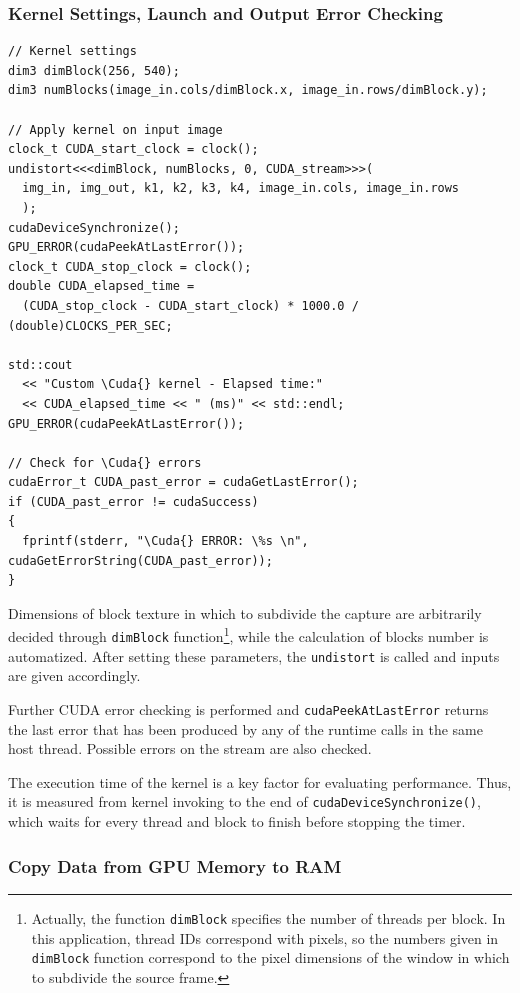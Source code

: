 \documentclass[12pt]{article}
\newcommand*{\Cuda}{\textsc{CUDA}}
\begin{document}
\subsubsection{Kernel Settings, Launch and Output Error Checking}
%
\begin{lstlisting}
// Kernel settings
dim3 dimBlock(256, 540);
dim3 numBlocks(image_in.cols/dimBlock.x, image_in.rows/dimBlock.y);

// Apply kernel on input image
clock_t CUDA_start_clock = clock();
undistort<<<dimBlock, numBlocks, 0, CUDA_stream>>>(
  img_in, img_out, k1, k2, k3, k4, image_in.cols, image_in.rows
  );
cudaDeviceSynchronize();
GPU_ERROR(cudaPeekAtLastError());
clock_t CUDA_stop_clock = clock();
double CUDA_elapsed_time =
  (CUDA_stop_clock - CUDA_start_clock) * 1000.0 / (double)CLOCKS_PER_SEC;

std::cout
  << "Custom \Cuda{} kernel - Elapsed time:"
  << CUDA_elapsed_time << " (ms)" << std::endl;
GPU_ERROR(cudaPeekAtLastError());

// Check for \Cuda{} errors
cudaError_t CUDA_past_error = cudaGetLastError();
if (CUDA_past_error != cudaSuccess)
{
  fprintf(stderr, "\Cuda{} ERROR: \%s \n", cudaGetErrorString(CUDA_past_error));
}
\end{lstlisting}
%
Dimensions of block texture in which to subdivide the capture are arbitrarily decided through \texttt{dimBlock} function\footnote{ Actually, the function \texttt{dimBlock} specifies the number of threads per block. In this application, thread IDs correspond with pixels, so the numbers given in \texttt{dimBlock} function correspond to the pixel dimensions of the window in which to subdivide the source frame.}, while the calculation of blocks number is automatized. After setting these parameters, the \texttt{undistort} is called and inputs are given accordingly.

Further \Cuda{} error checking is performed and \texttt{cudaPeekAtLastError} returns the last error that has been produced by any of the runtime calls in the same host thread. Possible errors on the stream are also checked.

The execution time of the kernel is a key factor for evaluating performance. Thus, it is measured from kernel invoking to the end of \texttt{cudaDeviceSynchronize()}, which waits for every thread and block to finish before stopping the timer.

\subsubsection{Copy Data from GPU Memory to RAM}
\end{document}
